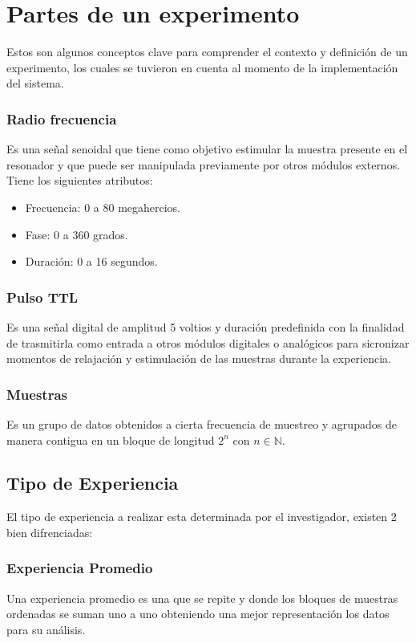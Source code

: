 \section{Partes de un experimento}

Estos son algunos conceptos clave para comprender el contexto y definici\'on de un
experimento, los cuales se tuvieron en cuenta al momento de la implementaci\'on 
del sistema.

\subsubsection{Radio frecuencia}
Es una se\~nal senoidal que tiene como objetivo
estimular la muestra presente en el resonador
y que puede ser manipulada previamente
por otros m\'odulos externos. Tiene los siguientes atributos:
    \begin{itemize}
        \item Frecuencia: 0 a 80 megahercios.
        \item Fase: 0 a 360 grados.
        \item Duraci\'on: 0 a 16 segundos.
    \end{itemize}

\subsubsection{Pulso TTL}
Es una se\~nal digital de amplitud 5 voltios y duraci\'on predefinida con la finalidad de trasmitirla como entrada a otros m\'odulos digitales o anal\'ogicos para sicronizar momentos de relajaci\'on y estimulaci\'on de las muestras durante la experiencia.

\subsubsection{Muestras}
Es un grupo de datos obtenidos a cierta frecuencia de muestreo y agrupados de manera contigua 
en un bloque de longitud $2^{n}$ con $n \in \mathbb{N}$. 

\subsection{Tipo de Experiencia}
El tipo de experiencia a realizar esta determinada por el investigador, existen 2 bien difrenciadas:

\subsubsection{Experiencia Promedio}
Una experiencia promedio es una que se repite y donde los bloques de muestras ordenadas se suman uno a uno obteniendo
una mejor representaci\'on los datos para su an\'alisis.

